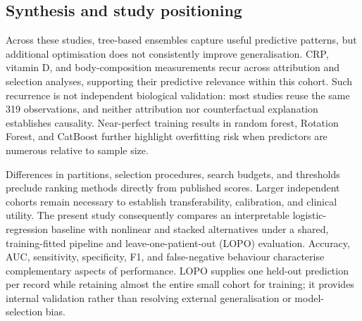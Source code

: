 \subsection{Synthesis and study positioning}
Across these studies, tree-based ensembles capture useful predictive patterns, but additional optimisation does not consistently improve generalisation. CRP, vitamin D, and body-composition measurements recur across attribution and selection analyses, supporting their predictive relevance within this cohort. Such recurrence is not independent biological validation: most studies reuse the same 319 observations, and neither attribution nor counterfactual explanation establishes causality. Near-perfect training results in random forest, Rotation Forest, and CatBoost further highlight overfitting risk when predictors are numerous relative to sample size.

Differences in partitions, selection procedures, search budgets, and thresholds preclude ranking methods directly from published scores. Larger independent cohorts remain necessary to establish transferability, calibration, and clinical utility. The present study consequently compares an interpretable logistic-regression baseline with nonlinear and stacked alternatives under a shared, training-fitted pipeline and leave-one-patient-out (LOPO) evaluation. Accuracy, AUC, sensitivity, specificity, F1, and false-negative behaviour characterise complementary aspects of performance. LOPO supplies one held-out prediction per record while retaining almost the entire small cohort for training; it provides internal validation rather than resolving external generalisation or model-selection bias.
